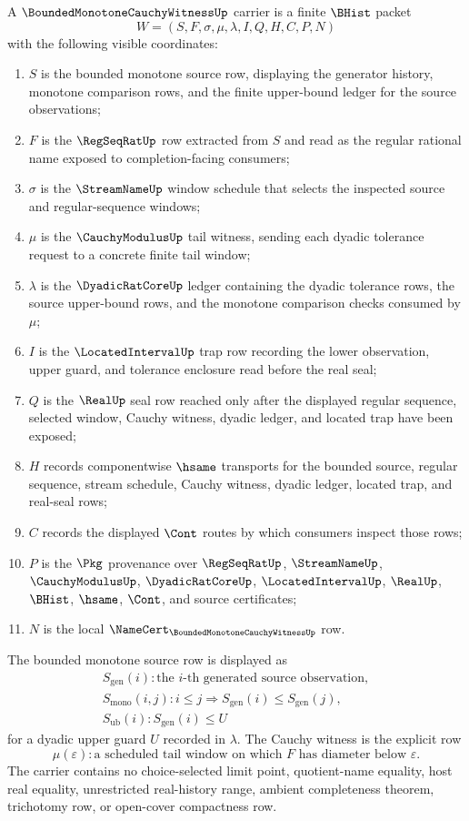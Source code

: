 \begin{definition}
\label{def:bounded-monotone-cauchy-witness-carrier}
A $\BoundedMonotoneCauchyWitnessUp$ carrier is a finite $\BHist$ packet
$$
W=(S,F,\sigma,\mu,\lambda,I,Q,H,C,P,N)
$$
with the following visible coordinates:
\begin{enumerate}
\item $S$ is the bounded monotone source row, displaying the generator history, monotone comparison rows, and the finite upper-bound ledger for the source observations;
\item $F$ is the $\RegSeqRatUp$ row extracted from $S$ and read as the regular rational name exposed to completion-facing consumers;
\item $\sigma$ is the $\StreamNameUp$ window schedule that selects the inspected source and regular-sequence windows;
\item $\mu$ is the $\CauchyModulusUp$ tail witness, sending each dyadic tolerance request to a concrete finite tail window;
\item $\lambda$ is the $\DyadicRatCoreUp$ ledger containing the dyadic tolerance rows, the source upper-bound rows, and the monotone comparison checks consumed by $\mu$;
\item $I$ is the $\LocatedIntervalUp$ trap row recording the lower observation, upper guard, and tolerance enclosure read before the real seal;
\item $Q$ is the $\RealUp$ seal row reached only after the displayed regular sequence, selected window, Cauchy witness, dyadic ledger, and located trap have been exposed;
\item $H$ records componentwise $\hsame$ transports for the bounded source, regular sequence, stream schedule, Cauchy witness, dyadic ledger, located trap, and real-seal rows;
\item $C$ records the displayed $\Cont$ routes by which consumers inspect those rows;
\item $P$ is the $\Pkg$ provenance over $\RegSeqRatUp$, $\StreamNameUp$, $\CauchyModulusUp$, $\DyadicRatCoreUp$, $\LocatedIntervalUp$, $\RealUp$, $\BHist$, $\hsame$, $\Cont$, and source certificates;
\item $N$ is the local $\NameCert_{\BoundedMonotoneCauchyWitnessUp}$ row.
\end{enumerate}
The bounded monotone source row is displayed as
$$
\begin{gathered}
S_{\mathrm{gen}}(i): \text{the } i\text{-th generated source observation},\\
S_{\mathrm{mono}}(i,j): i \leq j \Rightarrow S_{\mathrm{gen}}(i) \leq S_{\mathrm{gen}}(j),\\
S_{\mathrm{ub}}(i): S_{\mathrm{gen}}(i) \leq U
\end{gathered}
$$
for a dyadic upper guard $U$ recorded in $\lambda$. The Cauchy witness is the explicit row
$$
\mu(\varepsilon): \text{a scheduled tail window on which } F \text{ has diameter below } \varepsilon.
$$
The carrier contains no choice-selected limit point, quotient-name equality, host real equality, unrestricted real-history range, ambient completeness theorem, trichotomy row, or open-cover compactness row.
\end{definition}
